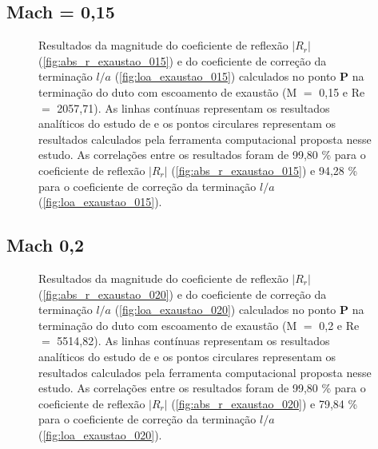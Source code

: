\newpage
\subsection{Mach = 0,15}

\begin{figure}[ht!]
\begin{subfigure}{\scaleA \textwidth}
  
\end{subfigure}%
\begin{subfigure}{\scaleA \textwidth}
  
\end{subfigure}
\caption[Resultados de $|R_{r}|$ e $l/a$ com escoamento de exaustão (M $=$ 0,15 e Re $=$ 2057,71)]{Resultados da magnitude do coeficiente de reflexão $|R_{r}|$ (\ref{fig:abs_r_exaustao_015}) e do coeficiente de correção da terminação $l/a$ (\ref{fig:loa_exaustao_015}) calculados no ponto $\textbf{P}$ na terminação do duto com escoamento de exaustão (M $=$ 0,15 e Re $=$ 2057,71). As linhas contínuas representam os resultados analíticos do estudo de  e os pontos circulares representam os resultados calculados pela ferramenta computacional proposta nesse estudo. As correlações entre os resultados foram de 99,80 \% para o coeficiente de reflexão $|R_{r}|$ (\ref{fig:abs_r_exaustao_015}) e 94,28 \% para o coeficiente de correção da terminação $l/a$ (\ref{fig:loa_exaustao_015}).}
\label{fig:resultados_exaustao_015}
\end{figure}


\newpage
\subsection{Mach 0,2}
\begin{figure}[ht!]
\begin{subfigure}{\scaleA \textwidth}
  
\end{subfigure}%
\begin{subfigure}{\scaleA \textwidth}
  
\end{subfigure}
\caption[Resultados de $|R_{r}|$ e $l/a$ com escoamento de exaustão (M $=$ 0,2 e Re $=$ 5514,82)]{Resultados da magnitude do coeficiente de reflexão $|R_{r}|$ (\ref{fig:abs_r_exaustao_020}) e do coeficiente de correção da terminação $l/a$ (\ref{fig:loa_exaustao_020}) calculados no ponto $\textbf{P}$ na terminação do duto com escoamento de exaustão (M $=$ 0,2 e Re $=$ 5514,82). As linhas contínuas representam os resultados analíticos do estudo de  e os pontos circulares representam os resultados calculados pela ferramenta computacional proposta nesse estudo. As correlações entre os resultados foram de 99,80 \% para o coeficiente de reflexão $|R_{r}|$ (\ref{fig:abs_r_exaustao_020}) e 79,84 \% para o coeficiente de correção da terminação $l/a$ (\ref{fig:loa_exaustao_020}).}
\label{fig:resultados_exaustao_020}
\end{figure}

